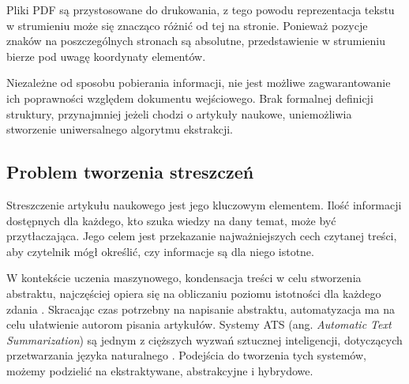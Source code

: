 \documentclass[12pt,a4paper,twoside]{article}
\begin{document}
Pliki PDF są przystosowane do drukowania, z tego powodu reprezentacja tekstu w strumieniu może się znacząco różnić od tej na stronie. Ponieważ pozycje znaków na poszczególnych stronach są absolutne, przedstawienie w strumieniu bierze pod uwagę koordynaty elementów.\par
Niezależne od sposobu pobierania informacji, nie jest możliwe zagwarantowanie ich poprawności względem dokumentu wejściowego. Brak formalnej definicji struktury, przynajmniej jeżeli chodzi o artykuły naukowe, uniemożliwia stworzenie uniwersalnego algorytmu ekstrakcji.
\subsection{Problem tworzenia streszczeń}
Streszczenie artykułu naukowego jest jego kluczowym elementem. Ilość informacji dostępnych dla każdego, kto szuka wiedzy na dany temat, może być przytłaczająca. Jego celem jest przekazanie najważniejszych cech czytanej treści, aby czytelnik mógł określić, czy informacje są dla niego istotne. \par
W kontekście uczenia maszynowego, kondensacja treści w celu stworzenia abstraktu, najczęściej opiera się na obliczaniu poziomu istotności dla każdego zdania \cite{MUTLU2020102359}. Skracając czas potrzebny na napisanie abstraktu, automatyzacja ma na celu ułatwienie autorom pisania artykułów. Systemy ATS (ang. \textit{Automatic Text Summarization}) są jednym z cięższych wyzwań sztucznej inteligencji, dotyczących przetwarzania języka naturalnego \cite{ELKASSAS2021113679}. Podejścia do tworzenia tych systemów, możemy podzielić na ekstraktywane, abstrakcyjne i hybrydowe. 
\end{document}
